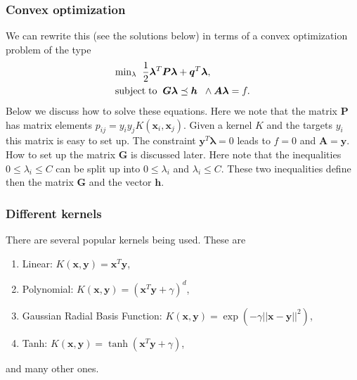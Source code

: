 \documentclass{beamer}
\begin{document}
\begin{frame}
\frametitle{Convex optimization}

We can rewrite this (see the solutions below) in terms of a convex optimization problem of the type
\begin{align*}
    &\mathrm{min}_{\lambda}\hspace{0.2cm} \frac{1}{2}\bm{\lambda}^T\bm{P}\bm{\lambda}+\bm{q}^T\bm{\lambda},\\ \nonumber
    &\mathrm{subject\hspace{0.1cm}to} \hspace{0.2cm} \bm{G}\bm{\lambda} \preceq \bm{h} \hspace{0.2cm} \wedge \bm{A}\bm{\lambda}=f.
\end{align*}
Below we discuss how to solve these equations. Here we note that the matrix $\bm{P}$ has matrix elements $p_{ij}=y_iy_jK(\bm{x}_i,\bm{x}_j)$.
Given a kernel $K$ and the targets $y_i$ this matrix is easy to set up. The constraint $\bm{y}^T\bm{\lambda}=0$ leads to $f=0$ and $\bm{A}=\bm{y}$. How to set up the matrix $\bm{G}$ is discussed later. Here note that the inequalities $0\leq \lambda_i \leq C$ can be split up into
$0\leq \lambda_i$ and $\lambda_i \leq C$. These two inequalities define then the matrix $\bm{G}$ and the vector $\bm{h}$.
\end{frame}

\begin{frame}
\frametitle{Different kernels}

There are several popular kernels being used. These are
\begin{enumerate}
\item Linear: $K(\bm{x},\bm{y})=\bm{x}^T\bm{y}$,

\item Polynomial: $K(\bm{x},\bm{y})=(\bm{x}^T\bm{y}+\gamma)^d$,

\item Gaussian Radial Basis Function: $K(\bm{x},\bm{y})=\exp{\left(-\gamma\vert\vert\bm{x}-\bm{y}\vert\vert^2\right)}$,

\item Tanh: $K(\bm{x},\bm{y})=\tanh{(\bm{x}^T\bm{y}+\gamma)}$,
\end{enumerate}

\noindent
and many other ones.
\end{frame}
\end{document}
